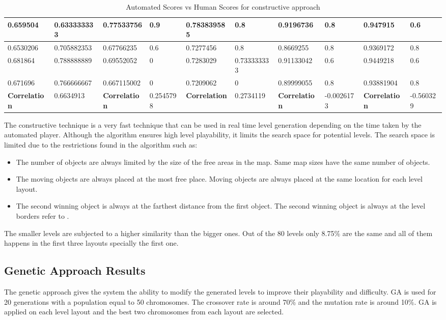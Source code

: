 \begin{landscape}
\begin{table}[!ht]
\begin{tabular}{|p{0.8in}|p{0.8in}|p{0.8in}|p{0.8in}|p{0.8in}|p{0.8in}|p{0.8in}|p{0.8in}|p{0.8in}|p{0.8in}|}
		\hline
		0.659504 & 0.633333333 & 0.77533756 & 0.9 & 0.783839585 & 0.8 & 0.9196736 & 0.8 & 0.947915 & 0.6\\
		\hline
		0.6530206 & 0.705882353 & 0.67766235 & 0.6 & 0.7277456 & 0.8 & 0.8669255 & 0.8 & 0.9369172 & 0.8\\
		\hline
		0.681864 & 0.788888889 & 0.69552052 & 0 & 0.7283029 & 0.733333333 & 0.91133042 & 0.6 & 0.9449218 & 0.6\\
		\hline
		0.671696 & 0.766666667 & 0.667115002 & 0 & 0.7209062 & 0 & 0.89999055 & 0.8 & 0.93881904 & 0.8\\
		\hline
		\textbf{Correlation} & 0.6634913 & \textbf{Correlation} & 0.2545798 & \textbf{Correlation} & 0.2734119 & \textbf{Correlation} & -0.0026173 & \textbf{Correlation} & -0.560329\\
		\hline
	\end{tabular}
	\caption{Automated Scores vs Human Scores for constructive approach}
	\label{Table:constructiveScores}
\end{table}
\end{landscape}

The constructive technique is a very fast technique that can be used in real time level generation depending on the time taken by the automated player. Although the algorithm ensures high level playability, it limits the search space for potential levels. The search space is limited due to the restrictions found in the algorithm such as:
\begin{itemize} \itemsep0pt \parskip0pt 
	\item The number of objects are always limited by the size of the free areas in the map. Same map sizes have the same number of objects.
	\item The moving objects are always placed at the most free place. Moving objects are always placed at the same location for each level layout.
	\item The second winning object is always at the farthest distance from the first object. The second winning object is always at the level borders refer to .
\end{itemize}

The smaller levels are subjected to a higher similarity than the bigger ones. Out of the 80 levels only 8.75\% are the same and all of them happens in the first three layouts specially the first one.

\subsection{Genetic Approach Results}
The genetic approach gives the system the ability to modify the generated levels to improve their playability and difficulty. GA is used for 20 generations with a population equal to 50 chromosomes. The crossover rate is around 70\% and the mutation rate is around 10\%. GA is applied on each level layout and the best two chromosomes from each layout are selected.\\\par

